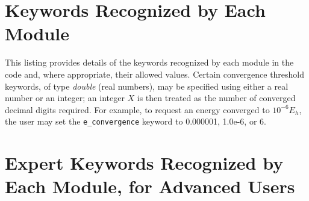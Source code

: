 \section{Keywords Recognized by Each Module}\label{keywords}
This listing provides details of the keywords recognized by each module in the
code and, where appropriate, their allowed values.  Certain convergence
threshold keywords, of type {\it double} (real numbers), may be specified using
either a real number or an integer; an integer $X$ is then treated as the
number of converged decimal digits required.  For example, to request an energy
converged to $10^{-6} E_h$, the user may set the {\tt e\_convergence} keyword
to 0.000001, 1.0e-6, or 6.

\section{Expert Keywords Recognized by Each Module, for Advanced Users}\label{expertkeywords}

